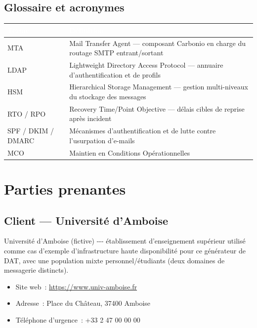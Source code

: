 \documentclass[11pt,a4paper]{report}
\newcommand{\tblhead}[1]{\textcolor{white}{\textbf{#1}}}
\begin{document}
\section{Glossaire et acronymes}
\begin{longtable}{|p{3.5cm}|p{9.5cm}|}
\hline
\rowcolor{primary}\tblhead{Terme} & \tblhead{Définition} \\
\hline
\endhead
MTA & Mail Transfer Agent --- composant Carbonio en charge du routage SMTP entrant/sortant \\
\hline
LDAP & Lightweight Directory Access Protocol --- annuaire d'authentification et de profils \\
\hline
HSM & Hierarchical Storage Management --- gestion multi-niveaux du stockage des messages \\
\hline
RTO / RPO & Recovery Time/Point Objective --- délais cibles de reprise après incident \\
\hline
SPF / DKIM / DMARC & Mécanismes d'authentification et de lutte contre l'usurpation d'e-mails \\
\hline
MCO & Maintien en Conditions Opérationnelles \\
\hline
\end{longtable}

\chapter{Parties prenantes}

\section{Client --- Université d'Amboise}
Université d'Amboise (fictive) -\allowbreak{}-\allowbreak{}-\allowbreak{} établissement d'enseignement supérieur utilisé comme cas d'exemple d'infrastructure haute disponibilité pour ce générateur de DAT, avec une population mixte personnel/étudiants (deux domaines de messagerie distincts).\allowbreak{}

\begin{itemize}[nosep]
  \item Site web~: \url{https://www.univ-amboise.fr }
  \item Adresse~: Place du Château, 37400 Amboise
  \item Téléphone d'urgence~: +33 2 47 00 00 00
\end{itemize}
\end{document}
